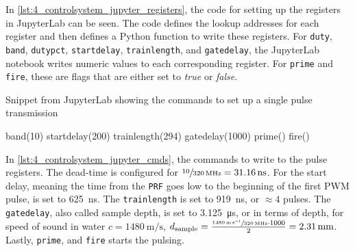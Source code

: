 In \cref{lst:4_controlsystem_jupyter_registers}, the code for setting up the registers in JupyterLab can be seen. The code defines the lookup addresses for each register and then defines a Python function to write these registers. For \texttt{duty}, \texttt{band}, \texttt{dutypct}, \texttt{startdelay}, \texttt{trainlength}, and \texttt{gatedelay}, the JupyterLab notebook writes numeric values to each corresponding register. For \texttt{prime} and \texttt{fire}, these are flags that are either set to \textit{true} or \textit{false}.

\begin{listing}[htbp]
	\centering
	\caption{Snippet from JupyterLab showing the commands to set up a single pulse transmission}
	\label{lst:4_controlsystem_jupyter_cmds}
	\begin{mintedpython}
band(10)
startdelay(200)
trainlength(294)
gatedelay(1000)
prime()
fire()
	\end{mintedpython}
\end{listing}
In \cref{lst:4_controlsystem_jupyter_cmds}, the commands to write to the pulse registers. The dead-time is configured for $\sfrac{10}{\qty{320}{\mega\hertz}}=\qty{31.16}{\nano\second}$. For the start delay, meaning the time from the \texttt{PRF} goes \gls{low} to the beginning of the first PWM pulse, is set to \qty{625}{\nano\second}. The \texttt{trainlength} is set to \qty{919}{\nano\second}, or $\approx4$ pulses. The \texttt{gatedelay}, also called sample depth, is set to \qty{3.125}{\micro\second}, or in terms of depth, for speed of sound in water $c=\qty{1480}{\meter\per\second}$, $d_{\mathrm{sample}}=\frac{\sfrac{\qty{1480}{\meter\per\second}}{\qty{320}{\mega\hertz}}\cdot1000}{2}=\qty{2.31}{\milli\meter}$. Lastly, \texttt{prime}, and \texttt{fire} starts the pulsing.


